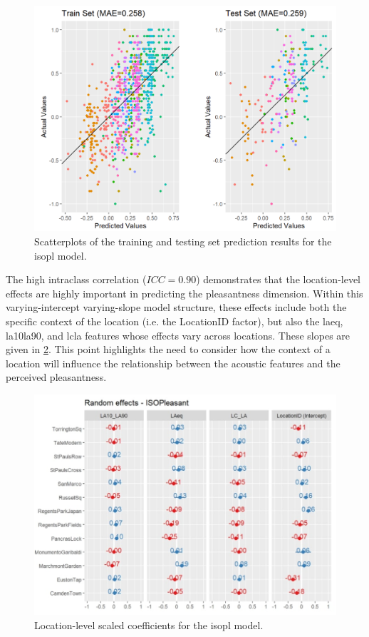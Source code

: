 \begin{figure}[h]
  \centering
  \includegraphics[width=.8\textwidth]{Figures/LockdownMAEPleasnt.png}
  \caption{Scatterplots of the training and testing set prediction results for the \gls{isopl} model. \label{fig:lockdownMAE}}
\end{figure}

   The high intraclass correlation ($ICC=0.90$) demonstrates that the location-level effects are highly important in predicting the pleasantness dimension. Within this varying-intercept varying-slope model structure, these effects include both the specific context of the location (i.e. the LocationID factor), but also the \gls{laeq}, \gls{la10la90}, and \gls{lcla} features whose effects vary across locations. These slopes are given in \cref{fig:pl-slopes}. This point highlights the need to consider how the context of a location will influence the relationship between the acoustic features and the perceived pleasantness.

   \begin{figure}[h]
     \centering
     \includegraphics[width=\textwidth]{Figures/Lockdown Figure4.jpg}
     \caption{Location-level scaled coefficients for the \gls{isopl} model. \label{fig:pl-slopes}}
   \end{figure}


